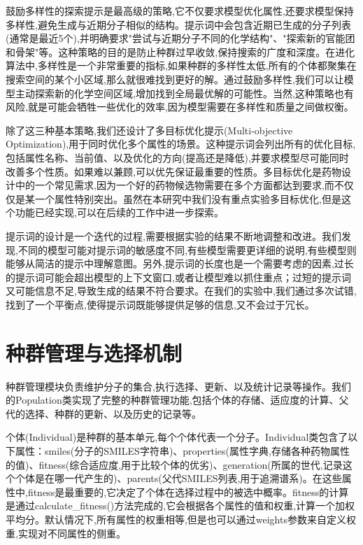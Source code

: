 鼓励多样性的探索提示是最高级的策略,它不仅要求模型优化属性,还要求模型保持多样性,避免生成与近期分子相似的结构。提示词中会包含近期已生成的分子列表(通常是最近5个),并明确要求"尝试与近期分子不同的化学结构"、"探索新的官能团和骨架"等。这种策略的目的是防止种群过早收敛,保持搜索的广度和深度。在进化算法中,多样性是一个非常重要的指标,如果种群的多样性太低,所有的个体都聚集在搜索空间的某个小区域,那么就很难找到更好的解。通过鼓励多样性,我们可以让模型主动探索新的化学空间区域,增加找到全局最优解的可能性。当然,这种策略也有风险,就是可能会牺牲一些优化的效率,因为模型需要在多样性和质量之间做权衡。

除了这三种基本策略,我们还设计了多目标优化提示(Multi-objective Optimization),用于同时优化多个属性的场景。这种提示词会列出所有的优化目标,包括属性名称、当前值、以及优化的方向(提高还是降低),并要求模型尽可能同时改善多个性质。如果难以兼顾,可以优先保证最重要的性质。多目标优化是药物设计中的一个常见需求,因为一个好的药物候选物需要在多个方面都达到要求,而不仅仅是某一个属性特别突出。虽然在本研究中我们没有重点实验多目标优化,但是这个功能已经实现,可以在后续的工作中进一步探索。

提示词的设计是一个迭代的过程,需要根据实验的结果不断地调整和改进。我们发现,不同的模型可能对提示词的敏感度不同,有些模型需要更详细的说明,有些模型则能够从简洁的提示中理解意图。另外,提示词的长度也是一个需要考虑的因素,过长的提示词可能会超出模型的上下文窗口,或者让模型难以抓住重点；过短的提示词又可能信息不足,导致生成的结果不符合要求。在我们的实验中,我们通过多次试错,找到了一个平衡点,使得提示词既能够提供足够的信息,又不会过于冗长。

\section{种群管理与选择机制}

种群管理模块负责维护分子的集合,执行选择、更新、以及统计记录等操作。我们的Population类实现了完整的种群管理功能,包括个体的存储、适应度的计算、父代的选择、种群的更新、以及历史的记录等。

个体(Individual)是种群的基本单元,每个个体代表一个分子。Individual类包含了以下属性：smiles(分子的SMILES字符串)、properties(属性字典,存储各种药物属性的值)、fitness(综合适应度,用于比较个体的优劣)、generation(所属的世代,记录这个个体是在哪一代产生的)、parents(父代SMILES列表,用于追溯谱系)。在这些属性中,fitness是最重要的,它决定了个体在选择过程中的被选中概率。fitness的计算是通过calculate\_fitness()方法完成的,它会根据各个属性的值和权重,计算一个加权平均分。默认情况下,所有属性的权重相等,但是也可以通过weights参数来自定义权重,实现对不同属性的侧重。

